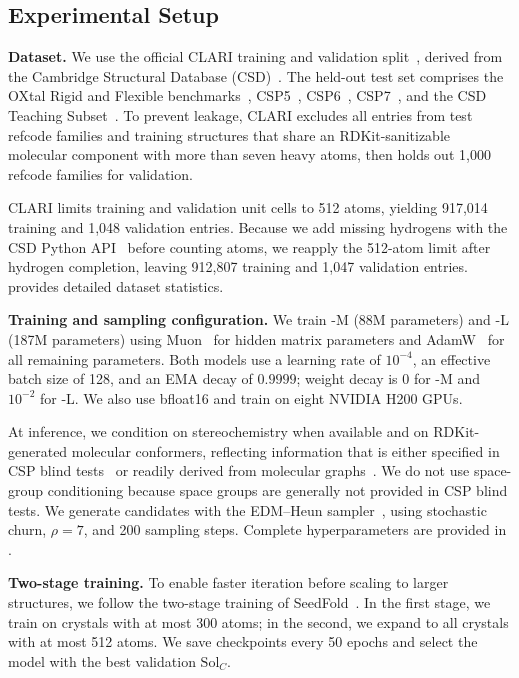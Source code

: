 \subsection{Experimental Setup}
\label{sec:setup}

\textbf{Dataset.}
We use the official CLARI training and validation split~\citep{lo2026clari}, derived from the Cambridge Structural Database (CSD)~\citep{groom2016cambridge}. The held-out test set comprises the OXtal Rigid and Flexible benchmarks~\citep{jin2025oxtal}, CSP5~\citep{bardwell2011fifth}, CSP6~\citep{reilly2016sixth}, CSP7~\citep{hunnisett2024seventhranking,hunnisett2024seventhgeneration}, and the CSD Teaching Subset~\citep{battle2010applications,lo2026clari}. To prevent leakage, CLARI excludes all entries from test refcode families and training structures that share an RDKit-sanitizable molecular component with more than seven heavy atoms, then holds out 1{,}000 refcode families for validation.

CLARI limits training and validation unit cells to 512 atoms, yielding 917{,}014 training and 1{,}048 validation entries. Because we add missing hydrogens with the CSD Python API~\citep{sykes2024scripting} before counting atoms, we reapply the 512-atom limit after hydrogen completion, leaving 912{,}807 training and 1{,}047 validation entries.  provides detailed dataset statistics.

\textbf{Training and sampling configuration.}
We train \ours{}-M (88M parameters) and \ours{}-L (187M parameters) using
Muon~\citep{liu2025muon} for hidden matrix parameters and
AdamW~\citep{loshchilov2019decoupled} for all remaining parameters. Both models
use a learning rate of $10^{-4}$, an effective batch size of 128, and an EMA
decay of $0.9999$; weight decay is 0 for \ours{}-M and $10^{-2}$ for
\ours{}-L. We also use bfloat16 and train on eight NVIDIA H200 GPUs.

At inference, we condition on stereochemistry when available and on RDKit-generated molecular conformers, reflecting information that is either specified in CSP blind
tests~\citep{reilly2016sixth} or readily derived from molecular
graphs~\citep{rdkit}. We do not use space-group conditioning because space groups
are generally not provided in CSP blind tests.
We generate candidates with the EDM--Heun sampler~\citep{karras2022elucidating},
using stochastic churn, $\rho=7$, and 200 sampling steps. Complete
hyperparameters are provided in
.

\textbf{Two-stage training.}
To enable faster iteration before scaling to larger structures, we follow the two-stage training of SeedFold~\citep{yi2025seedfold}. In the first stage, we train on crystals with at most 300 atoms; in the second, we expand to all crystals with at most 512 atoms. We save checkpoints every 50 epochs and select the model with the best validation $\mathrm{Sol}_C$.
